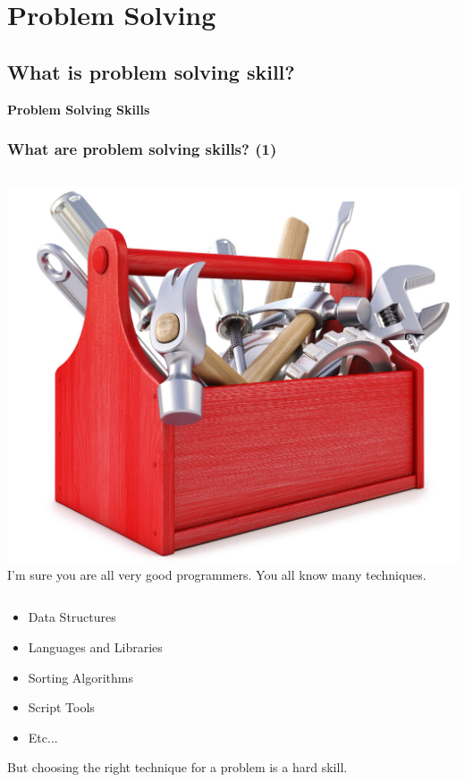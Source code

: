 \documentclass{beamer}
\begin{document}

\section{Problem Solving}
\subsection{What is problem solving skill?}

\begin{frame}
  \begin{center}
    {\bf Problem Solving Skills}
  \end{center}
\end{frame}

\begin{frame}
  \frametitle{What are problem solving skills? (1)}
  
  \begin{columns}
    \includegraphics[width=1\textwidth]{img/toolbox}
    I'm sure you are all very good programmers. You all know many
    techniques.
  \end{columns}

  \medskip

  \begin{itemize}
    \item Data Structures
    \item Languages and Libraries
    \item Sorting Algorithms
    \item Script Tools
    \item Etc...
  \end{itemize}
  
  \begin{center}
    But choosing the right technique for a problem is a \alert{hard}
    skill.
  \end{center}
  
\end{frame}
\end{document}
